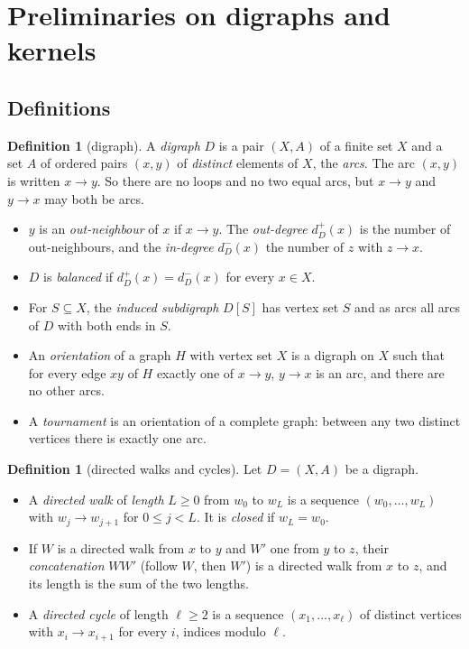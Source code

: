 \documentclass[11pt]{article}
\theoremstyle{plain}
\theoremstyle{definition}
\newtheorem{definition}[theorem]{Definition}
\theoremstyle{remark}
\newcommand{\dout}{d^{+}}
\newcommand{\din}{d^{-}}
\begin{document}
\section{Preliminaries on digraphs and kernels}\label{sec:digraphs}

\subsection{Definitions}

\begin{definition}[digraph]\label{def:digraph}
A \emph{digraph} $D$ is a pair $(X,A)$ of a finite set $X$ and a set $A$ of ordered pairs
$(x,y)$ of \emph{distinct} elements of $X$, the \emph{arcs}. The arc $(x,y)$ is written
$x\to y$. So there are no loops and no two equal arcs, but $x\to y$ and $y\to x$ may both be
arcs.
\begin{itemize}
  \item $y$ is an \emph{out-neighbour} of $x$ if $x\to y$. The \emph{out-degree} $\dout_D(x)$ is
    the number of out-neighbours, and the \emph{in-degree} $\din_D(x)$ the number of $z$ with
    $z\to x$.
  \item $D$ is \emph{balanced} if $\dout_D(x)=\din_D(x)$ for every $x\in X$.
  \item For $S\subseteq X$, the \emph{induced subdigraph} $D[S]$ has vertex set $S$ and as arcs
    all arcs of $D$ with both ends in $S$.
  \item An \emph{orientation} of a graph $H$ with vertex set $X$ is a digraph on $X$ such that
    for every edge $xy$ of $H$ exactly one of $x\to y$, $y\to x$ is an arc, and there are no
    other arcs.
  \item A \emph{tournament} is an orientation of a complete graph: between any two distinct
    vertices there is exactly one arc.
\end{itemize}
\end{definition}

\begin{definition}[directed walks and cycles]\label{def:diwalk}
Let $D=(X,A)$ be a digraph.
\begin{itemize}
  \item A \emph{directed walk} of \emph{length} $L\ge 0$ from $w_0$ to $w_L$ is a sequence
    $(w_0,\dots,w_L)$ with $w_j\to w_{j+1}$ for $0\le j<L$. It is \emph{closed} if $w_L=w_0$.
  \item If $W$ is a directed walk from $x$ to $y$ and $W'$ one from $y$ to $z$, their
    \emph{concatenation} $WW'$ (follow $W$, then $W'$) is a directed walk from $x$ to $z$, and its
    length is the sum of the two lengths.
  \item A \emph{directed cycle} of length $\ell\ge 2$ is a sequence $(x_1,\dots,x_\ell)$ of
    distinct vertices with $x_i\to x_{i+1}$ for every $i$, indices modulo $\ell$.
\end{itemize}
\end{definition}
\end{document}
